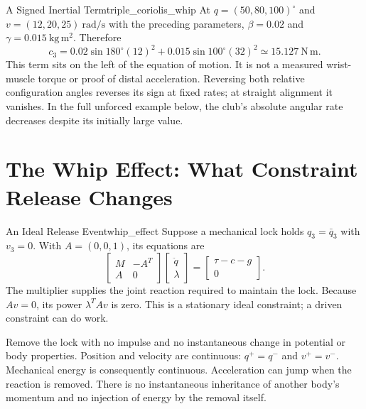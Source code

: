 \begin{example}{A Signed Inertial Term}{triple_coriolis_whip}
At $q=(50,80,100)^\circ$ and $v=(12,20,25)\ \mathrm{rad/s}$ with the preceding parameters, $\beta=0.02$ and $\gamma=0.015\ \mathrm{kg\,m^2}$. Therefore
\begin{equation}
c_3=0.02\sin180^\circ(12)^2+0.015\sin100^\circ(32)^2
\simeq15.127\ \mathrm{N\,m}.
\label{eq:coriolis_club_magnitude}
\end{equation}
This term sits on the left of the equation of motion. It is not a measured wrist-muscle torque or proof of distal acceleration. Reversing both relative configuration angles reverses its sign at fixed rates; at straight alignment it vanishes. In the full unforced example below, the club's absolute angular rate decreases despite its initially large value.
\end{example}

\section{The Whip Effect: What Constraint Release Changes}
\label{sec:whip_effect}
\label{princ:principle:whip_effect}
\begin{definition}{An Ideal Release Event}{whip_effect}
Suppose a mechanical lock holds $q_3=\bar q_3$ with $v_3=0$. With $A=(0,0,1)$, its equations are
\[
\begin{bmatrix}M&-A^T\\A&0\end{bmatrix}
\begin{bmatrix}\ddot q\\\lambda\end{bmatrix}
=\begin{bmatrix}\tau-c-g\\0\end{bmatrix}.
\]
The multiplier supplies the joint reaction required to maintain the lock. Because $Av=0$, its power $\lambda^T Av$ is zero. This is a stationary ideal constraint; a driven constraint can do work.

Remove the lock with no impulse and no instantaneous change in potential or body properties. Position and velocity are continuous: $q^+=q^-$ and $v^+=v^-$. Mechanical energy is consequently continuous. Acceleration can jump when the reaction is removed. There is no instantaneous inheritance of another body's momentum and no injection of energy by the removal itself.
\end{definition}


